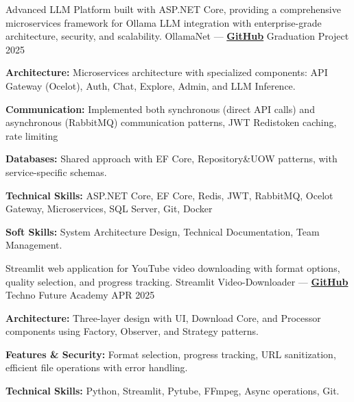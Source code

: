 

\begin{cventries}
\cventry
    {Advanced LLM Platform built with ASP.NET Core, providing a comprehensive microservices framework for Ollama LLM integration with enterprise-grade architecture, security, and scalability.
    } %
    {OllamaNet — \href{https://github.com/ollamaNet/OllamaNet_Components}{\color{midnightblue}\textbf{GitHub}} \textrm{\faArrowRight}} %
    {Graduation Project} %
    {2025} %
    {
      \begin{cvitems} %
        \item \textbf{Architecture:}{ Microservices architecture with specialized components: API Gateway (Ocelot), Auth, Chat, Explore, Admin, and LLM Inference.}
        \item \textbf{Communication:}{ Implemented both synchronous (direct API calls) and asynchronous (RabbitMQ) communication patterns, JWT Redistoken caching, rate limiting}
        \item \textbf{Databases:}{ Shared approach with EF Core, Repository&UOW patterns, with service-specific schemas.}
        \item \textbf{Technical Skills:}{ ASP.NET Core, EF Core, Redis, JWT, RabbitMQ, Ocelot Gateway, Microservices, SQL Server, Git, Docker}
        \item \textbf{Soft Skills:}{ System Architecture Design, Technical Documentation, Team Management.}
      \end{cvitems}
    }

\cventry
    {Streamlit web application for YouTube video downloading with format options, quality selection, and progress tracking.} %
    {Streamlit Video-Downloader — \href{https://github.com/ibrhmahmd/Youtube-videoDownloader}{\color{midnightblue}\textbf{GitHub}} \textrm{\faArrowRight}} %
    {Techno Future Academy} %
    {APR 2025} %
    {
      \begin{cvitems} %
        \item \textbf{Architecture:}{ Three-layer design with UI, Download Core, and Processor components using Factory, Observer, and Strategy patterns.}
        \item \textbf{Features \& Security:}{ Format selection, progress tracking, URL sanitization, efficient file operations with error handling.}
        \item \textbf{Technical Skills:}{ Python, Streamlit, Pytube, FFmpeg, Async operations, Git.}
      \end{cvitems}
    }
      

\end{cventries}
